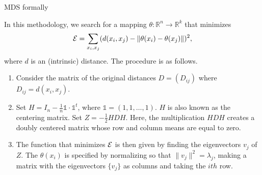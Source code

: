 \documentclass{beamer}
\begin{document}
\begin{frame}{MDS formally}

In this methodology, we search for a mapping $\theta \colon \mathbb{R}^n \to \mathbb{R}^k$ that minimizes
\begin{equation*}
	{\cal E}= \sum_{x_i,x_j} ( d(x_i,x_j) - \|\theta(x_i)-\theta(x_j)\|)^2,
\end{equation*}
where $d$ is an (intrinsic) distance. 
The procedure is as follows. 
\begin{enumerate}
	\item Consider the matrix of the original distances $D=(D_{ij})$ where $D_{ij}= d(x_i,x_j)$. 
	\item Set $H= I_n - \frac{1}{n} \mathbb{1} \cdot \mathbb{1}^t$, where $\mathbb{1}= (1,1, \ldots, 1)$. $H$ is also known as the centering matrix. Set $Z= -\frac{1}{2} H D H$. Here, the multiplication $HDH$ creates a doubly centered matrix whose row and column means are equal to zero.
	\item The function that minimizes $\cal E$ is then given by finding the eigenvectors $v_j$ of $Z$. The $\theta(x_i)$ is specified by normalizing so that $\|v_j\|^2=\lambda_j$, making a matrix with the eigenvectors $\{v_j\}$ as columns and taking the $ith$ row.
\end{enumerate}
\end{frame}
\end{document}
